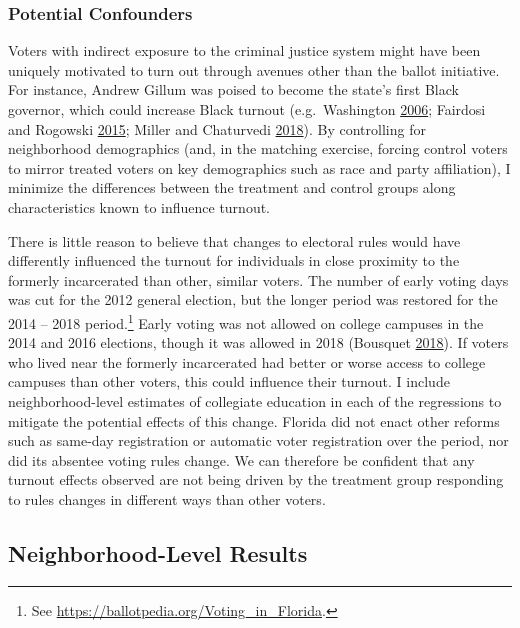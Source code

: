 \documentclass[
  12pt,
]{article}
\begin{document}
\hypertarget{potential-confounders}{%
\subsubsection*{Potential Confounders}\label{potential-confounders}}

Voters with indirect exposure to the criminal justice system might have been uniquely motivated to turn out through avenues other than the ballot initiative. For instance, Andrew Gillum was poised to become the state's first Black governor, which could increase Black turnout (e.g.~Washington \protect\hyperlink{ref-Washington2006}{2006}; Fairdosi and Rogowski \protect\hyperlink{ref-Fairdosi2015}{2015}; Miller and Chaturvedi \protect\hyperlink{ref-Miller2018}{2018}). By controlling for neighborhood demographics (and, in the matching exercise, forcing control voters to mirror treated voters on key demographics such as race and party affiliation), I minimize the differences between the treatment and control groups along characteristics known to influence turnout.

There is little reason to believe that changes to electoral rules would have differently influenced the turnout for individuals in close proximity to the formerly incarcerated than other, similar voters. The number of early voting days was cut for the 2012 general election, but the longer period was restored for the 2014 -- 2018 period.\footnote{See \url{https://ballotpedia.org/Voting_in_Florida}.} Early voting was not allowed on college campuses in the 2014 and 2016 elections, though it was allowed in 2018 (Bousquet \protect\hyperlink{ref-Bousquet2018a}{2018}). If voters who lived near the formerly incarcerated had better or worse access to college campuses than other voters, this could influence their turnout. I include neighborhood-level estimates of collegiate education in each of the regressions to mitigate the potential effects of this change. Florida did not enact other reforms such as same-day registration or automatic voter registration over the period, nor did its absentee voting rules change. We can therefore be confident that any turnout effects observed are not being driven by the treatment group responding to rules changes in different ways than other voters.

\hypertarget{neighborhood-level-results}{%
\subsection*{Neighborhood-Level Results}\label{neighborhood-level-results}}
\end{document}
